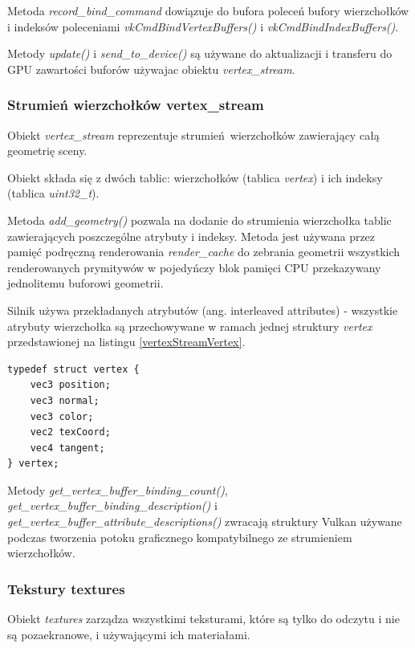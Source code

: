 Metoda \textit{record\_bind\_command} dowiązuje do bufora poleceń bufory wierzchołków i indeksów poleceniami \textit{vkCmdBindVertexBuffers()} i \textit{vkCmdBindIndexBuffers()}.

Metody \textit{update()} i \textit{send\_to\_device()} są używane do aktualizacji i transferu do GPU zawartości buforów używajac obiektu \textit{vertex\_stream}.


\subsubsection{Strumień wierzchołków vertex\_stream}
Obiekt \textit{vertex\_stream} reprezentuje strumień wierzchołków zawierający całą geometrię sceny.

Obiekt składa się z dwóch tablic: wierzchołków (tablica \textit{vertex}) i ich indeksy (tablica \textit{uint32\_t}).

Metoda \textit{add\_geometry()} pozwala na dodanie do strumienia wierzchołka tablic zawierających poszczególne atrybuty i indeksy.
Metoda jest używana przez pamięć podręczną renderowania \textit{render\_cache} do zebrania geometrii wszystkich renderowanych prymitywów w pojedyńczy blok pamięci CPU przekazywany jednolitemu buforowi geometrii.

Silnik używa przekładanych atrybutów (ang. interleaved attributes) - wszystkie atrybuty wierzchołka są przechowywane w ramach jednej struktury \textit{vertex} przedstawionej na listingu \ref{vertexStreamVertex}.
\lstset{language=C}
\begin{lstlisting}[caption={Struktura wierzchołka \textit{vertex}},captionpos=b,label={vertexStreamVertex}]
typedef struct vertex {
	vec3 position;
	vec3 normal;
	vec3 color;
	vec2 texCoord;
	vec4 tangent;
} vertex;
\end{lstlisting}

Metody \textit{get\_vertex\_buffer\_binding\_count()}, \textit{get\_vertex\_buffer\_binding\_description()} i \textit{get\_vertex\_buffer\_attribute\_descriptions()} zwracają struktury Vulkan używane podczas tworzenia potoku graficznego kompatybilnego ze strumieniem wierzchołków.


\subsubsection{Tekstury textures}
Obiekt \textit{textures} zarządza wszystkimi teksturami, które są tylko do odczytu i nie są pozaekranowe, i używającymi ich materiałami.


